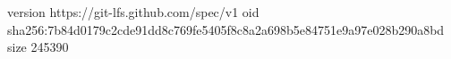 version https://git-lfs.github.com/spec/v1
oid sha256:7b84d0179c2cde91dd8c769fe5405f8c8a2a698b5e84751e9a97e028b290a8bd
size 245390
